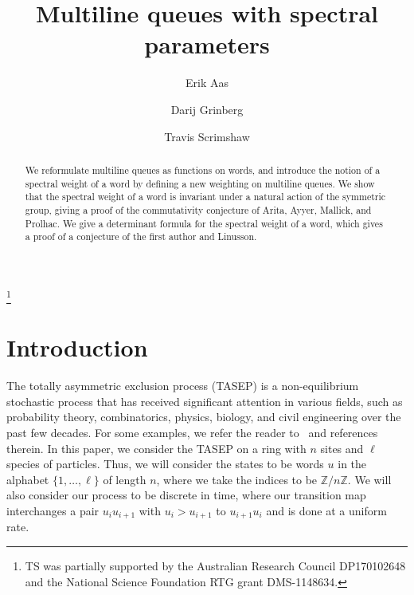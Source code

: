\documentclass[reqno]{amsart}
\newcommand{\0}{\phantom{c}}
\newcommand{\ZZ}{\mathbb{Z}}
\theoremstyle{plain}
\theoremstyle{definition}
\numberwithin{equation}{section}
\begin{document}
\title[MLQs]{Multiline queues with spectral parameters}

\author[E.~Aas]{Erik Aas}
\address[E. Aas]{Department of Mathematics, Pennsylvania State University, McAllister Building, State College, PA 116802, USA}

\author[D.~Grinberg]{Darij Grinberg}
\address[D. Grinberg]{School of Mathematics, University of Minnesota, 206 Church St. SE, Minneapolis, MN 55455}

\author[T.~Scrimshaw]{Travis Scrimshaw}
\address[T. Scrimshaw]{School of Mathematics and Physics, University of Queensland, St. Lucia, QLD 4072, Australia}


\thanks{TS was partially supported by the Australian Research Council DP170102648 and the National Science Foundation RTG grant DMS-1148634.}

\begin{abstract}
We reformulate multiline queues as functions on words, and introduce the notion of a spectral weight of a word by defining a new weighting on multiline queues.
We show that the spectral weight of a word is invariant under a natural action of the symmetric group, giving a proof of the commutativity conjecture of Arita, Ayyer, Mallick, and Prolhac.
We give a determinant formula for the spectral weight of a word, which gives a proof of a conjecture of the first author and Linusson.
\end{abstract}

\maketitle

\section{Introduction}
\label{sec:introduction}

The totally asymmetric exclusion process (TASEP) is a non-equilibrium stochastic process  that has received significant attention in various fields, such as probability theory, combinatorics, physics, biology, and civil engineering over the past few decades.
For some examples, we refer the reader to~\cite{AasLin17,AAMP,BE07,BP14,DEHP93,KMO15,KMO16} and references therein.
In this paper, we consider the TASEP on a ring with $n$ sites and $\ell$ species of particles.
Thus, we will consider the states to be words $u$ in the alphabet $\{1, \dotsc, \ell\}$ of length $n$, where we take the indices to be $\ZZ / n \ZZ$.
We will also consider our process to be discrete in time, where our transition map interchanges a pair $u_i u_{i+1}$ with $u_i > u_{i+1}$ to $u_{i+1} u_i$ and is done at a uniform rate.
\end{document}
